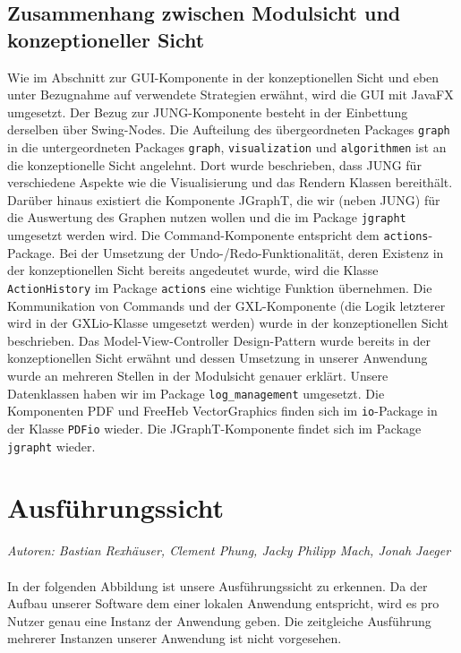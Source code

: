 \documentclass[enabledeprecatedfontcommands,fontsize=11pt,paper=a4,twoside]{scrartcl}
\newcounter{one}
\begin{document}
	
	\subsection{Zusammenhang zwischen Modulsicht und konzeptioneller Sicht} Wie im Abschnitt zur GUI-Komponente  in der konzeptionellen Sicht und eben unter Bezugnahme auf verwendete Strategien erwähnt, wird die GUI mit JavaFX umgesetzt. Der Bezug zur JUNG-Komponente besteht in der Einbettung derselben über Swing-Nodes. Die Aufteilung des übergeordneten Packages \texttt{graph} in die untergeordneten Packages \texttt{graph}, \texttt{visualization} und \texttt{algorithmen} ist an die konzeptionelle Sicht angelehnt. Dort wurde beschrieben, dass JUNG für verschiedene Aspekte wie die Visualisierung und das Rendern Klassen bereithält. Darüber hinaus existiert die Komponente JGraphT, die wir (neben JUNG) für die Auswertung des Graphen nutzen wollen und die im Package \texttt{jgrapht} umgesetzt werden wird. Die Command-Komponente entspricht dem \texttt{actions}-Package. Bei der Umsetzung der Undo-/Redo-Funktionalität, deren Existenz in der konzeptionellen Sicht bereits angedeutet wurde, wird die Klasse \texttt{ActionHistory} im Package \texttt{actions} eine wichtige Funktion übernehmen. Die Kommunikation von Commands und der GXL-Komponente (die Logik letzterer wird in der GXLio-Klasse umgesetzt werden) wurde in der konzeptionellen Sicht beschrieben. Das Model-View-Controller Design-Pattern wurde bereits in der konzeptionellen Sicht erwähnt und dessen Umsetzung in unserer Anwendung wurde an mehreren Stellen in der Modulsicht genauer erklärt. Unsere Datenklassen haben wir im Package \texttt{log\_management} umgesetzt. Die Komponenten PDF und FreeHeb VectorGraphics finden sich im \texttt{io}-Package in der Klasse \texttt{PDFio} wieder. Die JGraphT-Komponente findet sich im Package \texttt{jgrapht} wieder.
	
	
	
	\newpage
	\section{Ausführungssicht}
	\label{sec:ausfuehrung}
	\emph{Autoren: Bastian Rexhäuser, Clement Phung, Jacky Philipp Mach, Jonah Jaeger}\\ \\
	
	In der folgenden Abbildung ist unsere Ausführungssicht zu erkennen. Da der Aufbau unserer Software dem einer lokalen Anwendung entspricht, wird es pro Nutzer genau eine Instanz der Anwendung geben. Die zeitgleiche Ausführung mehrerer Instanzen unserer Anwendung ist nicht vorgesehen. \\
	
\end{document}
